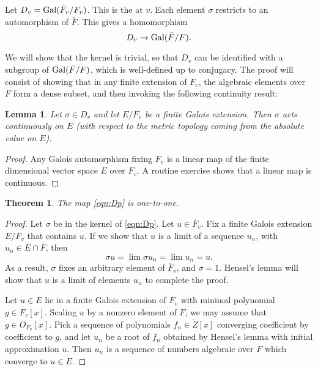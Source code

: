 \documentclass{amsart}
\newtheorem{theorem}[equation]{Theorem}
\newtheorem{lemma}[equation]{Lemma}
\def\oG{\op{Gal}}
\begin{document}
Let $D_v = \oG(\bar{F}_v/F_v)$.  This is the
 at $v$.  Each element $\sigma$ restricts
to an automorphism of $\bar{F}$.  This gives a homomorphism
\begin{equation}\label{eqn:Dp}
D_v\to \oG(\bar{F}/F).
\end{equation}

We will show that the kernel is trivial, so that $D_v$ can be
identified with a subgroup of $\oG(\bar{F}/F)$,
which is well-defined up to conjugacy.  The proof will consist of
showing that in any finite extension of $F_v$, the algebraic
elements over $F$ form a dense subset, and then invoking the
following continuity result:

\begin{lemma} Let $\sigma\in D_v$ and let $E/F_v$ be a finite Galois extension. 
Then $\sigma$ acts continuously on $E$ (with respect to the metric topology coming
from the absolute value on $E$).
\end{lemma}

\begin{proof}  Any Galois automorphism fixing $F_v$ is a linear map of
the finite dimensional vector space $E$ over $F_v$.  A routine exercise
shows that a linear map is continuous.
\end{proof}

\begin{theorem} The map \eqref{eqn:Dp} is one-to-one.
\end{theorem}

\begin{proof}
  Let $\sigma$ be in the kernel of \eqref{eqn:Dp}.  Let $u\in
  \bar{F}_v$.  Fix a finite Galois extension $E/F_v$
  that contains $u$.  If we show that $u$ is a limit of a sequence
  $u_n$, with $u_n\in E\cap \bar{F}$, then
\[
\sigma u = \lim \sigma u_n = \lim u_n = u.
\]
As a result, $\sigma$ fixes an arbitrary element of
$\bar{F}_v$, and $\sigma=1$.  Hensel's lemma will show
that $u$ is a limit of elements $u_n$ to complete the proof.


Let $u\in E$ lie in a finite Galois
extension of $F_v$ with minimal polynomial $g\in F_v[x]$.  Scaling
$u$ by a nonzero element of $F$, we may assume that $g\in O_{F_v}[x]$.  Pick a sequence
of polynomials $f_n\in\ring{Z}[x]$ converging coefficient by coefficient to 
$g$, and let $u_n$ be a root of $f_n$ obtained by Hensel's lemma with initial
approximation $u$.  Then $u_n$ is a sequence of numbers algebraic over $F$
which converge to $u\in E$.
\end{proof}
\end{document}
